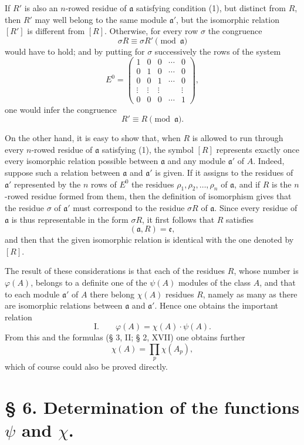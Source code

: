 If $R'$ is also an $n$-rowed residue of $\mathfrak a$ satisfying condition (1), but distinct from $R$, then $R'$ may well belong to the same module $\mathfrak a'$, but the isomorphic relation $[R']$ is different from $[R]$. Otherwise, for every row $\sigma$ the congruence
\[
 \sigma R\equiv\sigma R'\pmod{\mathfrak a}
\]
would have to hold; and by putting for $\sigma$ successively the rows of the system
\[
 E^0=\begin{pmatrix}
 1&0&0&\cdots&0\\
 0&1&0&\cdots&0\\
 0&0&1&\cdots&0\\
 \vdots&\vdots&\vdots&&\vdots\\
 0&0&0&\cdots&1
 \end{pmatrix},
\]
one would infer the congruence
\[
 R'\equiv R\pmod{\mathfrak a}.
\]

On the other hand, it is easy to show that, when $R$ is allowed to run through every $n$-rowed residue of $\mathfrak a$ satisfying (1), the symbol $[R]$ represents exactly once every isomorphic relation possible between $\mathfrak a$ and any module $\mathfrak a'$ of $A$. Indeed, suppose such a relation between $\mathfrak a$ and $\mathfrak a'$ is given. If it assigns to the residues of $\mathfrak a'$ represented by the $n$ rows of $E^0$ the residues $\rho_1,\rho_2,\ldots,\rho_n$ of $\mathfrak a$, and if $R$ is the $n$-rowed residue formed from them, then the definition of isomorphism gives that the residue $\sigma$ of $\mathfrak a'$ must correspond to the residue $\sigma R$ of $\mathfrak a$. Since every residue of $\mathfrak a$ is thus representable in the form $\sigma R$, it first follows that $R$ satisfies
\[
 (\mathfrak a,R)=\mathfrak e,
\]
and then that the given isomorphic relation is identical with the one denoted by $[R]$.

The result of these considerations is that each of the residues $R$, whose number is $\varphi(A)$, belongs to a definite one of the $\psi(A)$ modules of the class $A$, and that to each module $\mathfrak a'$ of $A$ there belong $\chi(A)$ residues $R$, namely as many as there are isomorphic relations between $\mathfrak a$ and $\mathfrak a'$. Hence one obtains the important relation
\[
\text{I.}\qquad \varphi(A)=\chi(A)\cdot\psi(A).
\]
From this and the formulas (§ 3, II; § 2, XVII) one obtains further
\[
 \chi(A)=\prod_p \chi(A_p),
\]
which of course could also be proved directly.

\section*{§ 6. Determination of the functions $\psi$ and $\chi$.}

